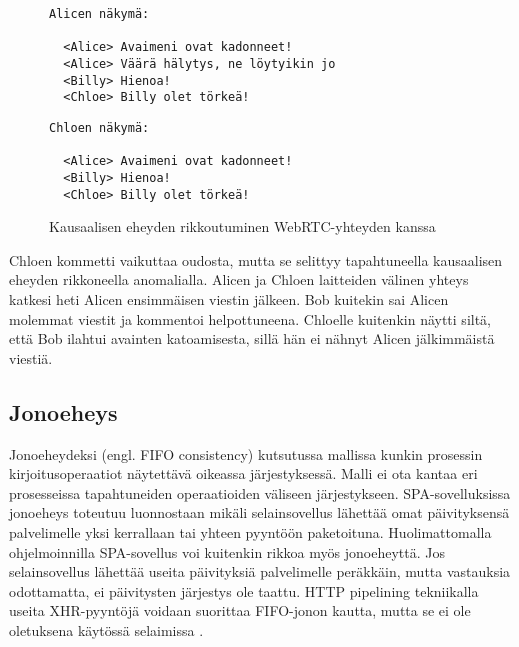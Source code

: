 \documentclass[finnish,twoside,censored,csm,sw-track-2018]{HYthesisML}
\begin{document}
\vspace{3mm}

\begin{figure}[ht]
\begin{minipage}{0.5\textwidth}
  \begin{Verbatim}[fontsize=\footnotesize]
  Alicen näkymä:
  
  <Alice> Avaimeni ovat kadonneet!
  <Alice> Väärä hälytys, ne löytyikin jo
  <Billy> Hienoa!
  <Chloe> Billy olet törkeä!
  \end{Verbatim}
\end{minipage}%
\begin{minipage}{0.5\textwidth}
\begin{Verbatim}[fontsize=\footnotesize]
  Chloen näkymä:
  
  <Alice> Avaimeni ovat kadonneet!
  <Billy> Hienoa!
  <Chloe> Billy olet törkeä!

\end{Verbatim}
\end{minipage}
\caption{Kausaalisen eheyden rikkoutuminen WebRTC-yhteyden kanssa}
\label{fig-kausaalinen-webrtc}
\end{figure}

Chloen kommetti vaikuttaa oudosta, mutta se selittyy tapahtuneella kausaalisen eheyden rikkoneella anomalialla. Alicen ja Chloen laitteiden välinen yhteys katkesi heti Alicen ensimmäisen viestin jälkeen. Bob kuitekin sai Alicen molemmat viestit ja kommentoi helpottuneena. Chloelle kuitenkin näytti siltä, että Bob ilahtui avainten katoamisesta, sillä hän ei nähnyt Alicen jälkimmäistä viestiä.

\subsection{Jonoeheys}

Jonoeheydeksi \citep{fifo} (engl. FIFO consistency) kutsutussa mallissa kunkin prosessin kirjoitusoperaatiot näytettävä oikeassa järjestyksessä. Malli ei ota kantaa eri prosesseissa tapahtuneiden operaatioiden väliseen järjestykseen. SPA-sovelluksissa jonoeheys toteutuu luonnostaan mikäli selainsovellus lähettää omat päivityksensä palvelimelle yksi kerrallaan tai yhteen pyyntöön paketoituna. Huolimattomalla ohjelmoinnilla SPA-sovellus voi kuitenkin rikkoa myös jonoeheyttä. Jos selainsovellus lähettää useita päivityksiä palvelimelle peräkkäin, mutta vastauksia odottamatta, ei päivitysten järjestys ole taattu. HTTP pipelining tekniikalla useita XHR-pyyntöjä voidaan suorittaa FIFO-jonon kautta, mutta se ei ole oletuksena käytössä selaimissa \citep{http-pipelining}.
\end{document}
